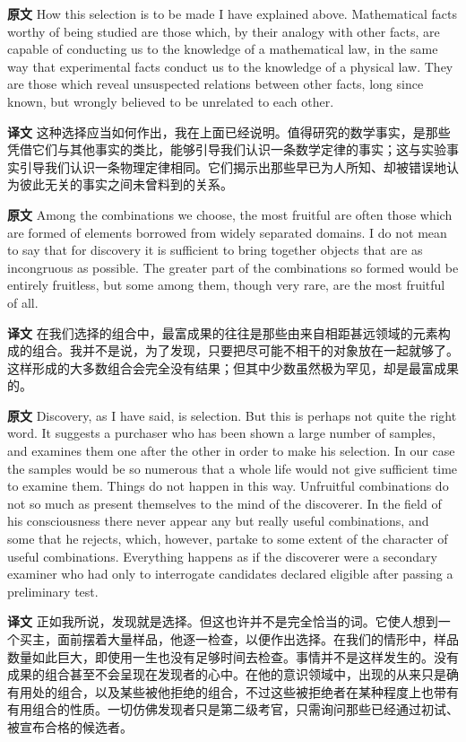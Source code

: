 \documentclass[UTF8,zihao=-4]{ctexart}
\newcommand{\BodyFont}{\fontsize{10.5pt}{15.5pt}\selectfont}
\newcommand{\origlabel}{\textbf{原文}\quad}
\newcommand{\translabel}{\textbf{译文}\quad}
\newenvironment{enblock}{\par\noindent\begingroup\BodyFont\origlabel}{\par\endgroup}
\newenvironment{zhblock}{\par\noindent\begingroup\BodyFont\translabel}{\par\endgroup\vspace{0.35em}}
\begin{document}
\begin{enblock}
How this selection is to be made I have explained above. Mathematical facts worthy of being studied are those which, by their analogy with other facts, are capable of conducting us to the knowledge of a mathematical law, in the same way that experimental facts conduct us to the knowledge of a physical law. They are those which reveal unsuspected relations between other facts, long since known, but wrongly believed to be unrelated to each other.
\end{enblock}
\begin{zhblock}
这种选择应当如何作出，我在上面已经说明。值得研究的数学事实，是那些凭借它们与其他事实的类比，能够引导我们认识一条数学定律的事实；这与实验事实引导我们认识一条物理定律相同。它们揭示出那些早已为人所知、却被错误地认为彼此无关的事实之间未曾料到的关系。\end{zhblock}

\begin{enblock}
Among the combinations we choose, the most fruitful are often those which are formed of elements borrowed from widely separated domains. I do not mean to say that for discovery it is sufficient to bring together objects that are as incongruous as possible. The greater part of the combinations so formed would be entirely fruitless, but some among them, though very rare, are the most fruitful of all.
\end{enblock}
\begin{zhblock}
在我们选择的组合中，最富成果的往往是那些由来自相距甚远领域的元素构成的组合。我并不是说，为了发现，只要把尽可能不相干的对象放在一起就够了。这样形成的大多数组合会完全没有结果；但其中少数虽然极为罕见，却是最富成果的。\end{zhblock}

\begin{enblock}
Discovery, as I have said, is selection. But this is perhaps not quite the right word. It suggests a purchaser who has been shown a large number of samples, and examines them one after the other in order to make his selection. In our case the samples would be so numerous that a whole life would not give sufficient time to examine them. Things do not happen in this way. Unfruitful combinations do not so much as present themselves to the mind of the discoverer. In the field of his consciousness there never appear any but really useful combinations, and some that he rejects, which, however, partake to some extent of the character of useful combinations. Everything happens as if the discoverer were a secondary examiner who had only to interrogate candidates declared eligible after passing a preliminary test.
\end{enblock}
\begin{zhblock}
正如我所说，发现就是选择。但这也许并不是完全恰当的词。它使人想到一个买主，面前摆着大量样品，他逐一检查，以便作出选择。在我们的情形中，样品数量如此巨大，即使用一生也没有足够时间去检查。事情并不是这样发生的。没有成果的组合甚至不会呈现在发现者的心中。在他的意识领域中，出现的从来只是确有用处的组合，以及某些被他拒绝的组合，不过这些被拒绝者在某种程度上也带有有用组合的性质。一切仿佛发现者只是第二级考官，只需询问那些已经通过初试、被宣布合格的候选者。\end{zhblock}
\end{document}
